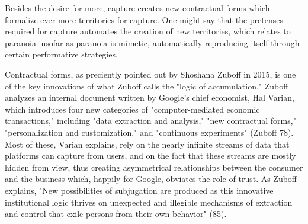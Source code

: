 \documentclass[11pt]{article}
\begin{document}
\begin{enumerate}
Besides the desire for more, capture creates new contractual forms
which formalize ever more territories for capture. One might say that
the pretenses required for capture automates the creation of new
territories, which relates to paranoia insofar as paranoia is mimetic,
automatically reproducing itself through certain performative
strategies.

Contractual forms, as preciently pointed out by Shoshana Zuboff in
2015, is one of the key innovations of what Zuboff calls the "logic of
accumulation." Zuboff analyzes an internal document written by
Google's chief economist, Hal Varian, which introduces four new
categories of "computer-mediated economic transactions," including
"data extraction and analysis," "new contractual forms,"
"personalization and customization," and "continuous experiments"
(Zuboff 78). Most of these, Varian explains, rely on the nearly
infinite streams of data that platforms can capture from users, and on
the fact that these streams are mostly hidden from view, thus creating
asymmetrical relationships between the consumer and the business
which, happily for Google, obviates the role of trust. As Zuboff
explains, "New possibilities of subjugation are produced as this
innovative institutional logic thrives on unexpected and illegible
mechanisms of extraction and control that exile persons from their own
behavior" (85).


\end{enumerate}
\end{document}
